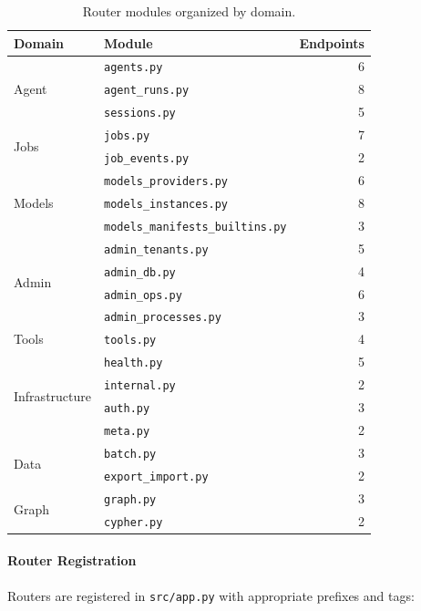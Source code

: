\begin{table}[htbp]
    \centering
    \caption{Router modules organized by domain.}
    \label{tab:router-modules}
    \small
    \begin{tabular}{llr}
        \toprule
        \textbf{Domain} & \textbf{Module} & \textbf{Endpoints} \\
        \midrule
        \multirow{3}{*}{Agent} & \texttt{agents.py} & 6 \\
        & \texttt{agent\_runs.py} & 8 \\
        & \texttt{sessions.py} & 5 \\
        \midrule
        \multirow{2}{*}{Jobs} & \texttt{jobs.py} & 7 \\
        & \texttt{job\_events.py} & 2 \\
        \midrule
        \multirow{3}{*}{Models} & \texttt{models\_providers.py} & 6 \\
        & \texttt{models\_instances.py} & 8 \\
        & \texttt{models\_manifests\_builtins.py} & 3 \\
        \midrule
        \multirow{4}{*}{Admin} & \texttt{admin\_tenants.py} & 5 \\
        & \texttt{admin\_db.py} & 4 \\
        & \texttt{admin\_ops.py} & 6 \\
        & \texttt{admin\_processes.py} & 3 \\
        \midrule
        Tools & \texttt{tools.py} & 4 \\
        \midrule
        \multirow{4}{*}{Infrastructure} & \texttt{health.py} & 5 \\
        & \texttt{internal.py} & 2 \\
        & \texttt{auth.py} & 3 \\
        & \texttt{meta.py} & 2 \\
        \midrule
        \multirow{2}{*}{Data} & \texttt{batch.py} & 3 \\
        & \texttt{export\_import.py} & 2 \\
        \midrule
        \multirow{2}{*}{Graph} & \texttt{graph.py} & 3 \\
        & \texttt{cypher.py} & 2 \\
        \bottomrule
    \end{tabular}
\end{table}

\paragraph{Router Registration}
Routers are registered in \texttt{src/app.py} with appropriate prefixes and tags:

